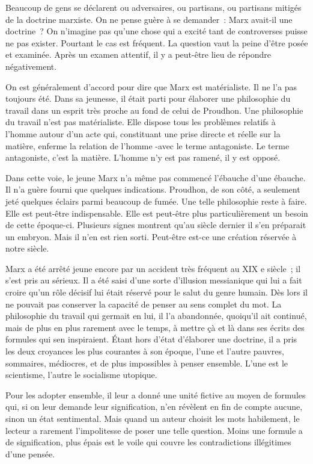 \documentclass[french,twoside]{book} %
\begin{document}
\noindent \par
Beaucoup de gens se déclarent ou adversaires, ou partisans, ou partisans mitigés de la doctrine marxiste. On ne pense guère à se demander : Marx avait-il une doctrine ? On n'imagine pas qu'une chose qui a excité tant de controverses puisse ne pas exister. Pourtant le cas est fréquent. La question vaut la peine d'être posée et examinée. Après un examen attentif, il y a peut-être lieu de répondre négativement.\par
On est généralement d'accord pour dire que Marx est matérialiste. Il ne l'a pas toujours été. Dans sa jeunesse, il était parti pour élaborer une philosophie du travail dans un esprit très proche au fond de celui de Proudhon. Une philosophie du travail n'est pas matérialiste. Elle dispose tous les problèmes relatifs à l'homme autour d'un acte qui, constituant une prise directe et réelle sur la matière, enferme la relation de l'homme -avec le terme antagoniste. Le terme antagoniste, c'est la matière. L'homme n'y est pas ramené, il y est opposé.\par
Dans cette voie, le jeune Marx n'a même pas commencé l'ébauche d'une ébauche. Il n'a guère fourni que quelques indications. Proudhon, de son côté, a seulement jeté quelques éclairs parmi beaucoup de fumée. Une telle philosophie reste à faire. Elle est peut-être indispensable. Elle est peut-être plus particulièrement un besoin de cette époque-ci. Plusieurs signes montrent qu'au siècle dernier il s'en préparait un embryon. Mais il n'en est rien sorti. Peut-être est-ce une création réservée à notre siècle.\par
Marx a été arrêté jeune encore par un accident très fréquent au XIX e siècle ; il s'est pris au sérieux. Il a été saisi d'une sorte d'illusion messianique qui lui a fait croire qu'un rôle décisif lui était réservé pour le salut du genre humain. Dès lors il ne pouvait pas conserver la capacité de penser au sens complet du mot. La philosophie du travail qui germait en lui, il l'a abandonnée, quoiqu'il ait continué, mais de plus en plus rarement avec le temps, à mettre çà et là dans ses écrits des formules qui sen inspiraient. Étant hors d'état d'élaborer une doctrine, il a pris les deux croyances les plus courantes à son époque, l'une et l'autre pauvres, sommaires, médiocres, et de plus impossibles à penser ensemble. L'une est le scientisme, l'autre le socialisme utopique.\par
Pour les adopter ensemble, il leur a donné une unité fictive au moyen de formules qui, si on leur demande leur signification, n'en révèlent en fin de compte aucune, sinon un état sentimental. Mais quand un auteur choisit les mots habilement, le lecteur a rarement l'impolitesse de poser une telle question. Moins une formule a de signification, plus épais est le voile qui couvre les contradictions illégitimes d'une pensée.\par
\end{document}
